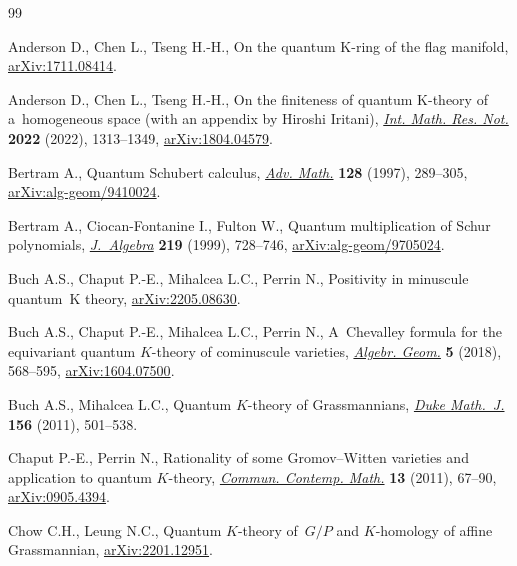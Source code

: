 \documentclass[pdftex]{sigma}
\numberwithin{equation}{section}
\theoremstyle{definition}
\begin{document}
\begin{thebibliography}{99}
\footnotesize\itemsep=0pt

Anderson D., Chen L., Tseng H.-H., On the quantum {K}-ring of the flag manifold,
 \href{http://arxiv.org/abs/1711.08414}{arXiv:1711.08414}.

Anderson D., Chen L., Tseng H.-H., On the finiteness of quantum {K}-theory of
 a~homogeneous space (with an appendix by {H}iroshi {I}ritani),
 \href{https://doi.org/10.1093/imrn/rnaa108}{\textit{Int. Math. Res. Not.}}
 \textbf{2022} (2022), 1313--1349,
 \href{http://arxiv.org/abs/1804.04579}{arXiv:1804.04579}.

Bertram A., Quantum {S}chubert calculus,
 \href{https://doi.org/10.1006/aima.1997.1627}{\textit{Adv. Math.}}
 \textbf{128} (1997), 289--305,
 \href{http://arxiv.org/abs/alg-geom/9410024}{arXiv:alg-geom/9410024}.

Bertram A., Ciocan-Fontanine I., Fulton W., Quantum multiplication of {S}chur
 polynomials,
 \href{https://doi.org/10.1006/jabr.1999.7960}{\textit{J.~Algebra}}
 \textbf{219} (1999), 728--746,
 \href{http://arxiv.org/abs/alg-geom/9705024}{arXiv:alg-geom/9705024}.

Buch A.S., Chaput P.-E., Mihalcea L.C., Perrin N., Positivity in minuscule
 quantum~{K} theory, \href{http://arxiv.org/abs/2205.08630}{arXiv:2205.08630}.

Buch A.S., Chaput P.-E., Mihalcea L.C., Perrin N., A~{C}hevalley formula for the
 equivariant quantum {$K$}-theory of cominuscule varieties,
 \href{https://doi.org/10.14231/ag-2018-015}{\textit{Algebr. Geom.}}
 \textbf{5} (2018), 568--595,
 \href{http://arxiv.org/abs/1604.07500}{arXiv:1604.07500}.

Buch A.S., Mihalcea L.C., Quantum {$K$}-theory of {G}rassmannians,
 \href{https://doi.org/10.1215/00127094-2010-218}{\textit{Duke Math.~J.}}
 \textbf{156} (2011), 501--538.

Chaput P.-E., Perrin N., Rationality of some {G}romov--{W}itten varieties and
 application to quantum {$K$}-theory,
 \href{https://doi.org/10.1142/S0219199711004166}{\textit{Commun. Contemp.
 Math.}} \textbf{13} (2011), 67--90,
 \href{http://arxiv.org/abs/0905.4394}{arXiv:0905.4394}.

Chow C.H., Leung N.C., Quantum {$K$}-theory of~{$G/P$} and {$K$}-homology of
 affine {G}rassmannian,
 \href{http://arxiv.org/abs/2201.12951}{arXiv:2201.12951}.


\end{thebibliography}
\end{document}
